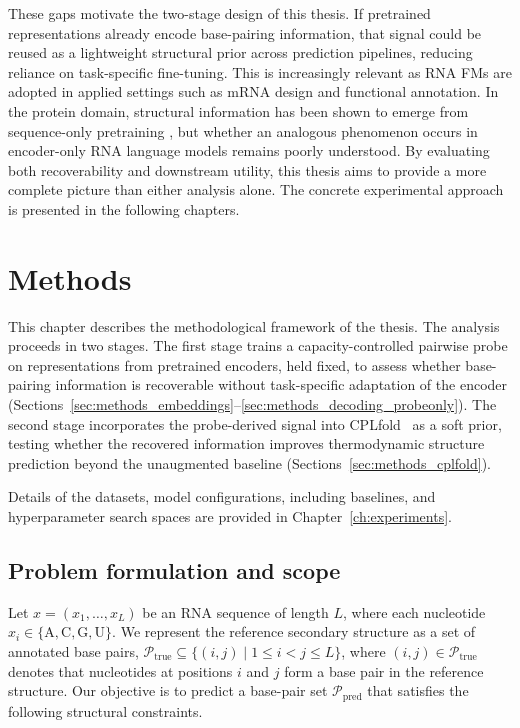 \documentclass[logo,bsc,singlespacing,parskip]{infthesis}
\begin{document}
These gaps motivate the two-stage design of this thesis. If 
pretrained representations already encode base-pairing 
information, that signal could be reused as a lightweight 
structural prior across prediction pipelines, reducing reliance 
on task-specific fine-tuning. This is increasingly relevant as 
RNA FMs are adopted in applied settings such as mRNA design and 
functional annotation. In the protein domain, structural 
information has been shown to emerge from sequence-only 
pretraining \citep{rives2021biological,lin2023evolutionary}, but 
whether an analogous phenomenon occurs in encoder-only RNA 
language models remains poorly understood. By evaluating both 
recoverability and downstream utility, this thesis aims to 
provide a more complete picture than either analysis alone. The 
concrete experimental approach is presented in the following 
chapters.

\chapter{Methods}
\label{ch:methods}
This chapter describes the methodological framework of the thesis. The analysis proceeds in two stages. The first stage trains a capacity-controlled pairwise probe on representations from pretrained encoders, held fixed, to assess whether base-pairing information is recoverable without task-specific adaptation of the encoder (Sections~\ref{sec:methods_embeddings}--\ref{sec:methods_decoding_probeonly}). The second stage incorporates the probe-derived signal into CPLfold~\citep{wang2026cplfold} as a soft prior, testing whether the recovered information improves thermodynamic structure prediction beyond the unaugmented baseline (Sections~\ref{sec:methods_cplfold}).

Details of the datasets, model configurations, including baselines, and hyperparameter search spaces are provided in Chapter~\ref{ch:experiments}.

\section{Problem formulation and scope}
\label{sec:methods_problem}
Let $x=(x_1,\dots,x_L)$ be an RNA sequence of length $L$, where each nucleotide $x_i \in \{\mathrm{A,C,G,U}\}$. We represent the
reference secondary structure as a set of annotated base pairs, $\mathcal{P}_{\mathrm{true}} \subseteq \{(i,j)\mid 1 \le i < j \le L\}$,
where \((i,j) \in \mathcal{P}_{\mathrm{true}}\) denotes that nucleotides
at positions \(i\) and \(j\) form a base pair in the reference structure.
Our objective is to predict a base-pair set
\(\mathcal{P}_{\mathrm{pred}}\) that satisfies the following
structural constraints.
\end{document}
